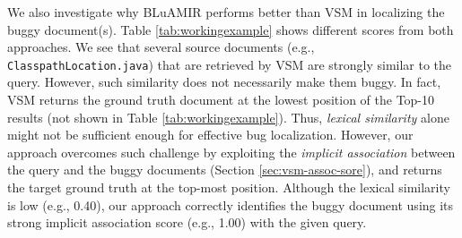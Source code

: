 \documentclass[conference]{IEEEtran}
\begin{document}
We also investigate why BLuAMIR performs better than VSM in localizing the buggy document(s). Table \ref{tab:workingexample} shows different scores from both approaches. We see that several source documents (e.g., \texttt{ClasspathLocation.java}) that are retrieved by VSM are  
strongly similar to the query. However, such similarity does not necessarily make them buggy. In fact, VSM returns the ground truth document at the lowest position of the Top-10 results (not shown in Table \ref{tab:workingexample}). Thus, \emph{lexical similarity} alone might not be sufficient enough for effective bug localization. However, our approach overcomes such challenge 
by exploiting the \emph{implicit association} between the query and the buggy documents (Section \ref{sec:vsm-assoc-sore}), and returns the target ground truth at the top-most position. Although the lexical similarity is low (e.g., 0.40), our approach correctly identifies the buggy document using its strong implicit association score (e.g., 1.00) with the given query.    





\end{document}
